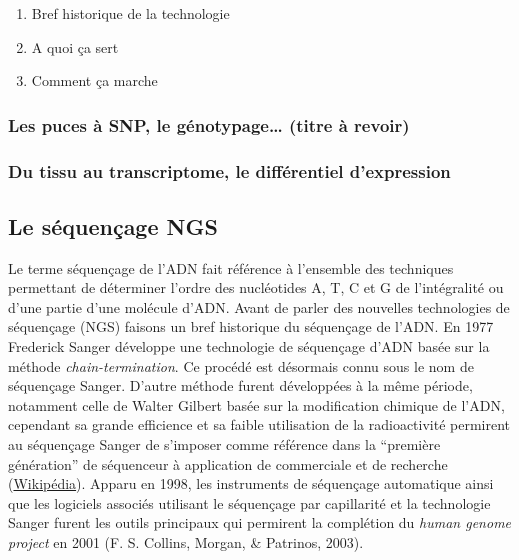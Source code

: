\documentclass[12pt,twoside]{reedthesis}
\providecommand{\tightlist}{%
  \setlength{\itemsep}{0pt}\setlength{\parskip}{0pt}}
\theoremstyle{definition}
\theoremstyle{definition}
\theoremstyle{remark}
\begin{document}
  \begin{enumerate}
  \def\labelenumi{\arabic{enumi}.}
  \tightlist
  \item
    Bref historique de la technologie\\
  \item
    A quoi ça sert
  \item
    Comment ça marche
  \end{enumerate}
  
  \subsubsection{Les puces à SNP, le génotypage\ldots{} (titre à
  revoir)}\label{les-puces-a-snp-le-genotypage-titre-a-revoir}
  
  \subsubsection{Du tissu au transcriptome, le différentiel
  d'expression}\label{du-tissu-au-transcriptome-le-differentiel-dexpression}
  
  \subsection{Le séquençage NGS}\label{le-sequencage-ngs}
  
  Le terme séquençage de l'ADN fait référence à l'ensemble des techniques
  permettant de déterminer l'ordre des nucléotides A, T, C et G de
  l'intégralité ou d'une partie d'une molécule d'ADN. Avant de parler des
  nouvelles technologies de séquençage (NGS) faisons un bref historique du
  séquençage de l'ADN. En 1977 Frederick Sanger développe une technologie
  de séquençage d'ADN basée sur la méthode \emph{chain-termination}. Ce
  procédé est désormais connu sous le nom de séquençage Sanger. D'autre
  méthode furent développées à la même période, notamment celle de Walter
  Gilbert basée sur la modification chimique de l'ADN, cependant sa grande
  efficience et sa faible utilisation de la radioactivité permirent au
  séquençage Sanger de s'imposer comme référence dans la ``première
  génération'' de séquenceur à application de commerciale et de recherche
  (\href{http://en.wikipedia.org/wiki/DNA_sequencing}{Wikipédia}). Apparu
  en 1998, les instruments de séquençage automatique ainsi que les
  logiciels associés utilisant le séquençage par capillarité et la
  technologie Sanger furent les outils principaux qui permirent la
  complétion du \emph{human genome project} en 2001 (F. S. Collins,
  Morgan, \& Patrinos, 2003).
  
\end{document}
